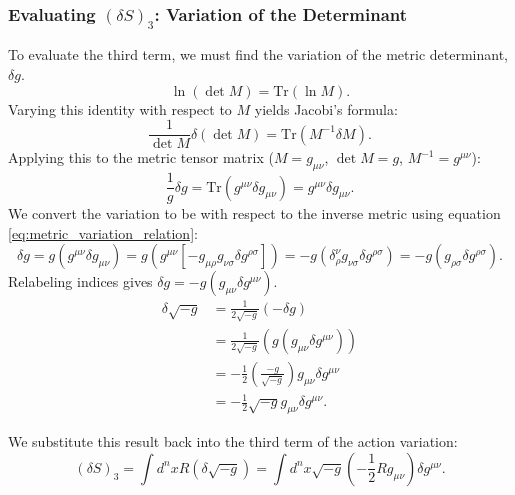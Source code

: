 \documentclass[11pt, a4paper]{report}
\begin{document}
\subsubsection*{Evaluating $(\delta S)_{3}$: Variation of the Determinant}

To evaluate the third term, we must find the variation of the metric determinant, $\delta g$. %
\begin{equation}
\ln(\det M) = \text{Tr}(\ln M). %
\end{equation}
Varying this identity with respect to $M$ yields Jacobi's formula:
\begin{equation}
\frac{1}{\det M} \delta(\det M) = \text{Tr}(M^{-1} \delta M). %
\end{equation}
Applying this to the metric tensor matrix ($M = g_{\mu\nu}$, $\det M = g$, $M^{-1} = g^{\mu\nu}$):
\begin{equation}
\frac{1}{g} \delta g = \text{Tr}(g^{\mu\nu} \delta g_{\mu\nu}) = g^{\mu\nu}\delta g_{\mu\nu}.
\end{equation}
We convert the variation to be with respect to the inverse metric using equation \eqref{eq:metric_variation_relation}:
\begin{equation}
\delta g = g (g^{\mu\nu} \delta g_{\mu\nu}) = g (g^{\mu\nu} [-g_{\mu\rho}g_{\nu\sigma} \delta g^{\rho\sigma}]) = -g (\delta^{\nu}_{\rho} g_{\nu\sigma} \delta g^{\rho\sigma}) = -g (g_{\rho\sigma} \delta g^{\rho\sigma}). %
\end{equation}
Relabeling indices gives $\delta g = -g (g_{\mu\nu} \delta g^{\mu\nu})$. %
\begin{align}
\delta \sqrt{-g} &= \frac{1}{2\sqrt{-g}} (-\delta g) \nonumber \\
                 &= \frac{1}{2\sqrt{-g}} (g (g_{\mu\nu} \delta g^{\mu\nu})) \nonumber \\
                 &= -\frac{1}{2} \left( \frac{-g}{\sqrt{-g}} \right) g_{\mu\nu} \delta g^{\mu\nu} \nonumber \\
                 &= -\frac{1}{2} \sqrt{-g} g_{\mu\nu} \delta g^{\mu\nu}. %
\end{align}

We substitute this result back into the third term of the action variation:
\begin{equation}
(\delta S)_{3} = \int d^{n}x R (\delta \sqrt{-g}) = \int d^{n}x \sqrt{-g} \left( -\frac{1}{2} R g_{\mu\nu} \right) \delta g^{\mu\nu}. %
\end{equation}
\end{document}
